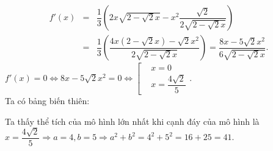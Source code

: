 \begin{ex}
{\begin{eqnarray*}
f'(x) &=& \dfrac{1}{3}\left(2x\sqrt{2-\sqrt{2}x} - x^2 \dfrac{\sqrt{2}}{2\sqrt{2-\sqrt{2}x}}\right)\\
&=& \dfrac{1}{3}\left(\dfrac{4x(2-\sqrt{2}x) - \sqrt{2}x^2}{2\sqrt{2-\sqrt{2}x}}\right) = \dfrac{8x-5\sqrt{2}x^2}{6\sqrt{2-\sqrt{2}x}}.
\end{eqnarray*}
$f'(x) = 0 \Leftrightarrow 8x - 5\sqrt{2}x^2 = 0 \Leftrightarrow \left[ \begin{aligned} & x=0 \\ & x = \dfrac{4\sqrt{2}}{5} \end{aligned} \right.$.\\
Ta có bảng biến thiên:
\begin{center}
\end{center}
Ta thấy thể tích của mô hình lớn nhất khi cạnh đáy của mô hình là \\
$x = \dfrac{4\sqrt{2}}{5} \Rightarrow a=4, b=5 \Rightarrow a^2+b^2 = 4^2+5^2 = 16+25 = 41$.
}
\end{ex}

